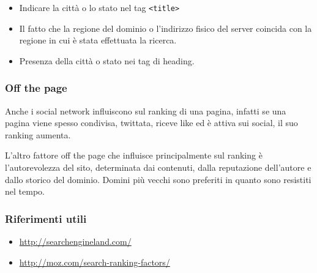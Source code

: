 \begin{itemize}
	\item Indicare la città o lo stato nel tag \texttt{<title>}
	\item Il fatto che la regione del dominio o l'indirizzo fisico del server coincida con la regione in cui è stata effettuata la ricerca.
	\item Presenza della città o stato nei tag di heading.
\end{itemize}

\subsubsection{Off the page}

Anche i social network influiscono sul ranking di una pagina, infatti se una pagina viene spesso condivisa, twittata, riceve like ed è attiva sui social, il suo ranking aumenta.

L'altro fattore off the page che influisce principalmente sul ranking è l'autorevolezza del sito, determinata dai contenuti, dalla reputazione dell'autore e dallo storico del dominio. Domini più vecchi sono preferiti in quanto sono resistiti nel tempo.


\subsubsection{Riferimenti utili}

\begin{itemize}
	\item \url{http://searchengineland.com/}
	\item \url{http://moz.com/search-ranking-factors/}
\end{itemize}








